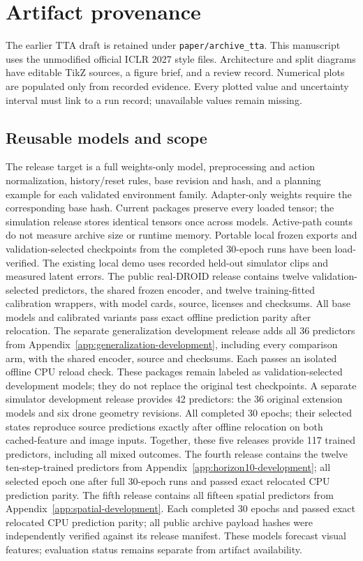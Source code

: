 \FloatBarrier
\section{Artifact provenance}
The earlier TTA draft is retained under \texttt{paper/archive\_tta}.
This manuscript uses the unmodified official ICLR 2027 style files.
Architecture and split diagrams have editable TikZ sources, a figure
brief, and a review record. Numerical plots are populated only from
recorded evidence. Every plotted value and uncertainty interval
must link to a run record; unavailable values remain missing.
\subsection{Reusable models and scope}
The release target is a full weights-only model, preprocessing and action
normalization, history/reset rules, base revision and hash, and a planning
example for each validated environment family. Adapter-only weights require
the corresponding base hash. Current packages preserve every loaded tensor;
the simulation release stores identical tensors once across models. Active-path
counts do not measure archive size or runtime memory.
Portable local frozen exports and validation-selected checkpoints from the
completed 30-epoch runs have been load-verified. The existing local demo uses
recorded held-out simulator clips and measured latent errors.
The public real-DROID release contains twelve validation-selected predictors,
the shared frozen encoder, and twelve training-fitted calibration wrappers,
with model cards, source, licenses and checksums. All base models and
calibrated variants pass exact offline prediction parity after relocation.
The separate generalization development release adds all 36 predictors from
Appendix~\ref{app:generalization-development}, including every comparison arm,
with the shared encoder, source and checksums. Each passes an isolated offline
CPU reload check. These packages remain labeled as validation-selected
development models; they do not replace the original test checkpoints.
A separate simulator development release provides 42 predictors: the 36 original
extension models and six drone geometry revisions. All completed 30 epochs;
their selected states reproduce source predictions exactly after offline
relocation on both cached-feature and image inputs. Together, these
five releases provide 117 trained predictors, including all mixed outcomes.
The fourth release contains the twelve ten-step-trained predictors from
Appendix~\ref{app:horizon10-development}; all selected epoch one after full
30-epoch runs and passed exact relocated CPU prediction parity.
The fifth release contains all fifteen spatial predictors from
Appendix~\ref{app:spatial-development}. Each completed 30 epochs and passed
exact relocated CPU prediction parity; all public archive payload hashes
were independently verified against its release manifest.
These models forecast visual features; evaluation status remains separate
from artifact availability.

